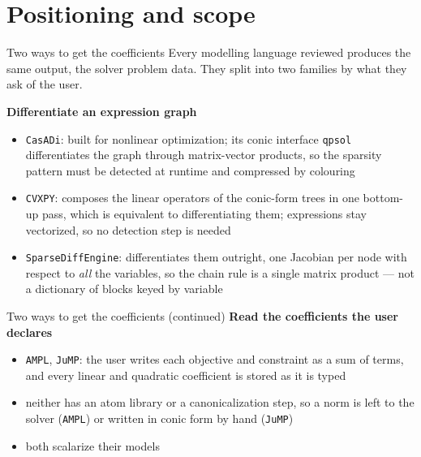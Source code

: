 \documentclass[10pt,mathserif,aspectratio=169]{beamer}
\newcommand{\sde}{\texttt{SparseDiffEngine}}
\newcommand{\cvxpy}{\texttt{CVXPY}}
\begin{document}
\section{Positioning and scope}

\begin{frame}[label=bk-families]{Two ways to get the coefficients}
\vspace{-0.5ex}
{\small Every modelling language reviewed produces the same output, the solver problem data. They
split into two families by what they ask of the user.}

\vspace{1.5ex}
{\small\color{polyblue}\textbf{Differentiate an expression graph}}
\begin{itemize}\small
  \item \texttt{CasADi}: built for nonlinear optimization; its conic interface \texttt{qpsol}
        differentiates the graph through matrix-vector products, so the sparsity pattern must be
        {\color{polyblue}detected at runtime} and compressed by colouring
  \item \cvxpy{}: composes the linear operators of the conic-form trees in one bottom-up pass,
        which is equivalent to differentiating them; expressions stay vectorized, so no detection
        step is needed
  \item {\color{polyblue}\sde{}}: differentiates them outright, one Jacobian per node with
        respect to \emph{all} the variables, so the chain rule is a single matrix product ---
        not a dictionary of blocks keyed by variable
\end{itemize}
\end{frame}

\begin{frame}{Two ways to get the coefficients (continued)}
\vspace{-0.5ex}
{\small\color{polyblue}\textbf{Read the coefficients the user declares}}
\begin{itemize}\small
  \item \texttt{AMPL}, \texttt{JuMP}: the user writes each objective and constraint as a sum of
        terms, and every linear and quadratic coefficient is stored as it is typed
  \item neither has an atom library or a canonicalization step, so a norm is left to the solver
        (\texttt{AMPL}) or written in conic form by hand (\texttt{JuMP})
  \item both scalarize their models
\end{itemize}
\end{frame}
\end{document}
